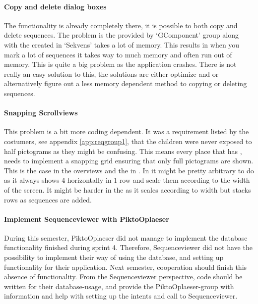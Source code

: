 \paragraph{Copy and delete dialog boxes} The functionality is already completely there, it is possible to both copy and delete sequences. The problem is the  provided by `GComponent' group along with the  created in `Sekvens' takes a lot of memory. This results in when you mark a lot of sequences it takes way to much memory and often run out of memory. This is quite a big problem as the application crashes. There is not really an easy solution to this, the solutions are either optimize  and  or alternatively figure out a less memory dependent method to copying or deleting sequences. 

\paragraph{Snapping Scrollviews} This problem is a bit more coding dependent. It was a requirement listed by the costumers, see appendix \ref{app:reqgroup1}, that the children were never exposed to half pictograms as they might be confusing. This means every place that has , needs to implement a snapping grid ensuring that only full pictograms are shown. This is the case in the overviews  and the  in . In  it might be pretty arbitrary to do as it always shows 4  horizontally in 1 row and scale them according to the width of the screen. It might be harder in the  as it scales according to width but stacks rows as sequences are added. 

\paragraph{Implement Sequenceviewer with PiktoOplaeser}
During this semester, PiktoOplaeser did not manage to implement the database functionality finished during sprint 4. Therefore, Sequenceviewer did not have the possibility to implement their way of using the database, and setting up functionality for their application. Next semester, cooperation should finish this absence of functionality. From the Sequenceviewer perspective, code should be written for their database-usage, and provide the PiktoOplaeser-group with information and help with setting up the intents and call to Sequenceviewer.

